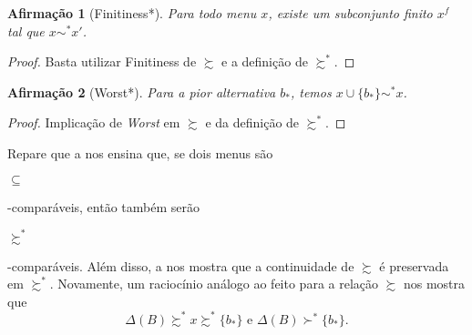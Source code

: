 \documentclass[12pt, a4paper]{article}
\theoremstyle{nonumberplain}
\newtheorem{proof}{Dem.}
\theoremstyle{plain}
\theoremstyle{plain}
\newtheorem{claim}{Afirmação}
\theoremstyle{plain}
\theoremstyle{nonumberplain}
\begin{document}
\begin{claim}[Finitiness*]Para todo menu $x$, existe um subconjunto finito $x^f$ tal que $x\sim^* x'$.\end{claim}
\begin{proof}
Basta utilizar Finitiness de $\succsim$ e a definição de $\succsim^*$.
\end{proof}
\begin{claim}[Worst*] Para a pior alternativa $b_*$, temos $x\cup\{b_*\}\sim^* x$.\end{claim}
\begin{proof}
Implicação de \textit{Worst} em $\succsim$ e da definição de $\succsim^*$.
\end{proof}

Repare que a  nos ensina que, se dois menus são \begin{small}$\subseteq$\end{small}-comparáveis, então também serão \begin{small}$\succsim^*$\end{small}-comparáveis. Além disso, a  nos mostra que a continuidade de $\succsim$ é preservada em $\succsim^*$. Novamente, um raciocínio análogo ao feito para a relação $\succsim$ nos mostra que \[\Delta(B)\succsim^* x\succsim^* \{b_*\} \text{ e } \Delta(B)\succ^* \{b_*\}.\]
\end{document}
